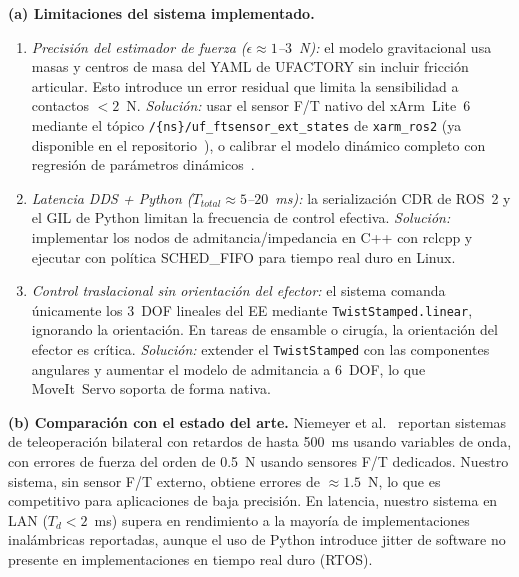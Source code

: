 \documentclass[journal,10pt,twoside]{IEEEtran}
\begin{document}
\textbf{(a) Limitaciones del sistema implementado.}
\begin{enumerate}[label=\roman*.]
  \item \textit{Precisión del estimador de fuerza ($\epsilon \approx 1$--$3$~N):}
        el modelo gravitacional usa masas y centros de masa
        del YAML de UFACTORY sin incluir fricción articular. Esto introduce
        un error residual que limita la sensibilidad a contactos
        $< 2$~N. \textit{Solución:} usar el sensor F/T nativo del
        xArm~Lite~6 mediante el tópico
        \texttt{/\{ns\}/uf\_ftsensor\_ext\_states} de \texttt{xarm\_ros2}
        (ya disponible en el repositorio~\cite{xarm_ros2}), o calibrar
        el modelo dinámico completo con regresión de parámetros
        dinámicos~\cite{siciliano2009}.
  \item \textit{Latencia DDS + Python ($T_{total} \approx 5$--$20$~ms):}
        la serialización CDR de ROS~2 y el GIL de Python limitan la
        frecuencia de control efectiva. \textit{Solución:} implementar
        los nodos de admitancia/impedancia en C++ con rclcpp y ejecutar
        con política SCHED\_FIFO para tiempo real duro en Linux.
  \item \textit{Control traslacional sin orientación del efector:}
        el sistema comanda únicamente los 3~DOF lineales del EE mediante
        \texttt{TwistStamped.linear}, ignorando la orientación.
        En tareas de ensamble o cirugía, la orientación del efector
        es crítica. \textit{Solución:} extender el \texttt{TwistStamped}
        con las componentes angulares y aumentar el modelo de admitancia
        a 6~DOF, lo que MoveIt~Servo soporta de forma nativa.
\end{enumerate}

\textbf{(b) Comparación con el estado del arte.}
Niemeyer et al.~\cite{niemeyer2008} reportan sistemas de teleoperación
bilateral con retardos de hasta 500~ms usando variables de onda,
con errores de fuerza del orden de 0.5~N usando sensores F/T
dedicados. Nuestro sistema, sin sensor F/T externo, obtiene errores
de ${\approx}1.5$~N, lo que es competitivo para aplicaciones de
baja precisión. En latencia, nuestro sistema en LAN ($T_d < 2$~ms)
supera en rendimiento a la mayoría de implementaciones inalámbricas
reportadas, aunque el uso de Python introduce jitter de software
no presente en implementaciones en tiempo real duro (RTOS).
\end{document}
